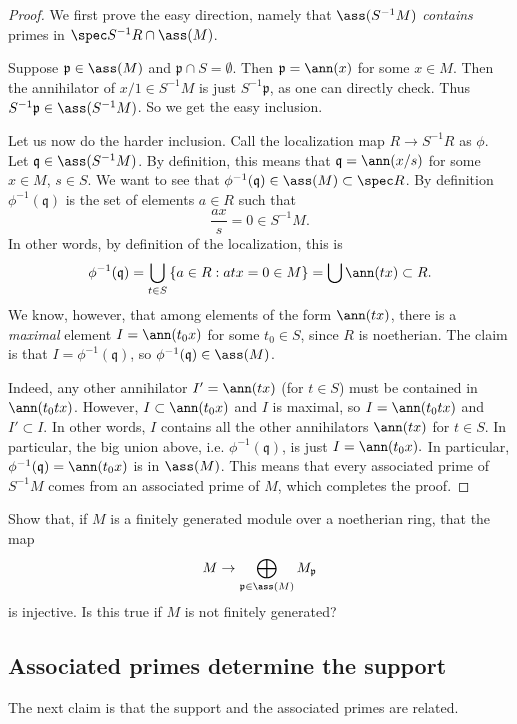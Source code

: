 \begin{proof} 
We first prove the easy direction, namely that $\ass(S^{-1}M)$
\emph{contains} primes in $\spec S^{-1}R \cap \ass(M)$. 

Suppose $\mathfrak{p} \in \ass(M)$ and
$\mathfrak{p} \cap S = \emptyset$. Then $\mathfrak{p} = \ann(x)$ for some $x
\in M$. Then the annihilator of $x/1 \in S^{-1}M$ is just $S^{-1}\mathfrak{p}$, as one
can directly check. Thus $S^{-1}\mathfrak{p} \in \ass(S^{-1}M)$.
So we get the easy inclusion.

Let us now do the harder inclusion.  
Call the localization map $R \to S^{-1}R  $ as $\phi$.
Let $\mathfrak{q} \in \ass(S^{-1}M)$. By definition, this means that $\mathfrak{q} =
\ann(x/s)$ for some $x \in M$, $s \in S$. We want to see that
$\phi^{-1}(\mathfrak{q}) \in \ass(M) \subset \spec R$.
By definition $\phi^{-1}(\mathfrak{q})$ is the set of elements $a \in R$ such that
\[ \frac{ax}{s} = 0 \in S^{-1}M . \]
In other words, by definition of the localization, this is 
\[  \phi^{-1}(\mathfrak{q}) = \bigcup_{t \in S} \left\{a \in R: atx = 0 \in M\right\} = \bigcup \ann(tx)
\subset R.\]
We know, however, that among elements of the form $\ann(tx)$, there is a
\emph{maximal} element $I=\ann(t_0 x)$ for some $t_0 \in S$, since $R$ is
noetherian.  The claim is that $I = \phi^{-1}(\mathfrak{q})$, so
$\phi^{-1}(\mathfrak{q}) \in \ass(M)$.

Indeed,  any other annihilator $I' = \ann(tx)$ (for $t \in S$) must be contained in $\ann(t_0 t x)$. However, 
\( I \subset \ann(t_0 x)  \)
and $I$ is maximal, so $I = \ann(t_0 t x)$ and
\( I' \subset I.  \) In other words, $I$ contains all the other annihilators
$\ann(tx)$ for $t \in S$.
In particular, the big union above, i.e. $\phi^{-1}(\mathfrak{q})$, is just
\( I = \ann(t_0 x).  \)
In particular, $\phi^{-1}(\mathfrak{q}) = \ann(t_0x)$ is in $\ass(M)$.
This means that every associated prime
of $S^{-1}M$ comes from an associated prime of $M$, which completes the proof.
\end{proof} 



\begin{exercise} 
Show that, if $M$ is a finitely generated module over a noetherian ring, that
the map
\[ M \to \bigoplus_{\mathfrak{p} \in \ass(M)} M_{\mathfrak{p}}  \]
is injective. Is this true if $M$ is not finitely generated?
\end{exercise} 

\subsection{Associated primes determine the support}
The next claim is that the support and the associated primes are related.

